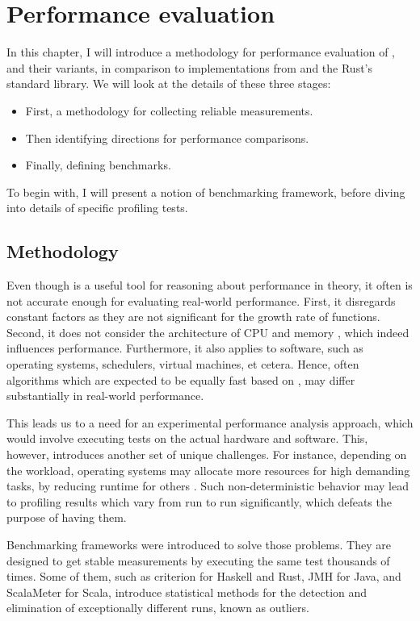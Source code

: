 \chapter{Performance evaluation}

In this chapter, I will introduce a methodology for performance evaluation of \rrbvec{}, \pvec{} and their variants, in comparison to implementations from \imrsvec{} and the Rust's standard library. We will look at the details of these three stages:

\begin{itemize}
    \item First, a methodology for collecting reliable measurements. 
    \item Then identifying directions for performance comparisons. 
    \item Finally, defining benchmarks. 
\end{itemize}

To begin with, I will present a notion of benchmarking framework, before diving into details of specific profiling tests. 

\section{Methodology}
Even though \bigo{}  is a useful tool for reasoning about performance in theory, it often is not accurate enough for evaluating real-world performance. First, it disregards constant factors as they are not significant for the growth rate of functions. Second, it does not consider the architecture of CPU and memory , which indeed influences performance. Furthermore, it also applies to software, such as operating systems, schedulers, virtual machines, et cetera. Hence, often algorithms which are expected to be equally fast based on \bigo{}, may differ substantially in real-world performance. 

This leads us to a need for an experimental performance analysis approach, which would involve executing tests on the actual hardware and software. This, however, introduces another set of unique challenges. For instance, depending on the workload, operating systems may allocate more resources for high demanding tasks, by reducing runtime for others . Such non-deterministic behavior may lead to profiling results which vary from run to run significantly, which defeats the purpose of having them. 

Benchmarking frameworks were introduced to solve those problems. They are designed to get stable measurements by executing the same test thousands of times. Some of them, such as criterion  for Haskell and Rust, JMH  for Java, and ScalaMeter for Scala, introduce statistical methods for the detection and elimination of exceptionally different runs, known as outliers. 

